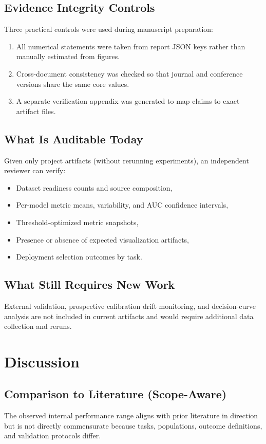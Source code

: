 \documentclass[journal]{IEEEtran}
\begin{document}
\subsection{Evidence Integrity Controls}
Three practical controls were used during manuscript preparation:
\begin{enumerate}
    \item All numerical statements were taken from report JSON keys rather than manually estimated from figures.
    \item Cross-document consistency was checked so that journal and conference versions share the same core values.
    \item A separate verification appendix was generated to map claims to exact artifact files.
\end{enumerate}

\subsection{What Is Auditable Today}
Given only project artifacts (without rerunning experiments), an independent reviewer can verify:
\begin{itemize}
    \item Dataset readiness counts and source composition,
    \item Per-model metric means, variability, and AUC confidence intervals,
    \item Threshold-optimized metric snapshots,
    \item Presence or absence of expected visualization artifacts,
    \item Deployment selection outcomes by task.
\end{itemize}

\subsection{What Still Requires New Work}
External validation, prospective calibration drift monitoring, and decision-curve analysis are not included in current artifacts and would require additional data collection and reruns.

\section{Discussion}
\subsection{Comparison to Literature (Scope-Aware)}
The observed internal performance range aligns with prior literature in direction but is not directly commensurate because tasks, populations, outcome definitions, and validation protocols differ.
\end{document}
